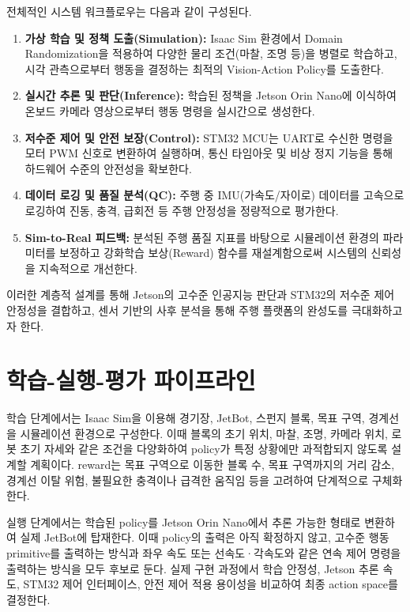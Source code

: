 \documentclass[titlepage]{pnureport}
\begin{document}
전체적인 시스템 워크플로우는 다음과 같이 구성된다.
\begin{enumerate}
    \item \textbf{가상 학습 및 정책 도출(Simulation):} Isaac Sim 환경에서 Domain Randomization을 적용하여 다양한 물리 조건(마찰, 조명 등)을 병렬로 학습하고, 시각 관측으로부터 행동을 결정하는 최적의 Vision-Action Policy를 도출한다.
    \item \textbf{실시간 추론 및 판단(Inference):} 학습된 정책을 Jetson Orin Nano에 이식하여 온보드 카메라 영상으로부터 행동 명령을 실시간으로 생성한다.
    \item \textbf{저수준 제어 및 안전 보장(Control):} STM32 MCU는 UART로 수신한 명령을 모터 PWM 신호로 변환하여 실행하며, 통신 타임아웃 및 비상 정지 기능을 통해 하드웨어 수준의 안전성을 확보한다.
    \item \textbf{데이터 로깅 및 품질 분석(QC):} 주행 중 IMU(가속도/자이로) 데이터를 고속으로 로깅하여 진동, 충격, 급회전 등 주행 안정성을 정량적으로 평가한다.
    \item \textbf{Sim-to-Real 피드백:} 분석된 주행 품질 지표를 바탕으로 시뮬레이션 환경의 파라미터를 보정하고 강화학습 보상(Reward) 함수를 재설계함으로써 시스템의 신뢰성을 지속적으로 개선한다.
\end{enumerate}

이러한 계층적 설계를 통해 Jetson의 고수준 인공지능 판단과 STM32의 저수준 제어 안정성을 결합하고, 센서 기반의 사후 분석을 통해 주행 플랫폼의 완성도를 극대화하고자 한다. 

\section{학습-실행-평가 파이프라인}

학습 단계에서는 Isaac Sim을 이용해 경기장, JetBot, 스펀지 블록, 목표 구역, 경계선을 시뮬레이션 환경으로 구성한다. 이때 블록의 초기 위치, 마찰, 조명, 카메라 위치, 로봇 초기 자세와 같은 조건을 다양화하여 policy가 특정 상황에만 과적합되지 않도록 설계할 계획이다. reward는 목표 구역으로 이동한 블록 수, 목표 구역까지의 거리 감소, 경계선 이탈 위험, 불필요한 충격이나 급격한 움직임 등을 고려하여 단계적으로 구체화한다.

실행 단계에서는 학습된 policy를 Jetson Orin Nano에서 추론 가능한 형태로 변환하여 실제 JetBot에 탑재한다. 이때 policy의 출력은 아직 확정하지 않고, 고수준 행동 primitive를 출력하는 방식과 좌우 속도 또는 선속도·각속도와 같은 연속 제어 명령을 출력하는 방식을 모두 후보로 둔다. 실제 구현 과정에서 학습 안정성, Jetson 추론 속도, STM32 제어 인터페이스, 안전 제어 적용 용이성을 비교하여 최종 action space를 결정한다.
\end{document}
